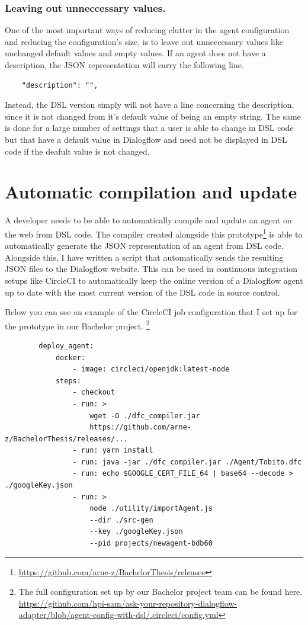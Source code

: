 \subsubsection{Leaving out unneccessary values.}

One of the most important ways of reducing clutter in the agent configuration and reducing the configuration's size, is to leave out unneccessary values like unchanged default values and empty values.
If an agent does not have a description, the JSON representation will carry the following line.
\begin{verbatim}
    "description": "",
\end{verbatim}
Instead, the DSL version simply will not have a line concerning the description, since it is not changed from it's default value of being an empty string.
The same is done for a large number of settings that a user is able to change in DSL code but that have a default value in Dialogflow and need not be displayed in DSL code if the deafult value is not changed.


\section{Automatic compilation and update}
A developer needs to be able to automatically compile and update an agent on the web from DSL code.
The compiler created alongside this prototype\footnote{\url{https://github.com/arne-z/BachelorThesis/releases}} is able to automatically generate the JSON representation of an agent from DSL code.
Alongside this, I have written a script that automatically sends the resulting JSON files to the Dialogflow website.
This can be used in continuous integration setups like CircleCI \cite{CircleCI} to automatically keep the online version of a Dialogflow agent up to date with the most current version of the DSL code in source control.

Below you can see an example of the CircleCI job configuration that I set up for the prototype in our Bachelor project.
\footnote{The full configuration set up by our Bachelor project team can be found here.\\
\url{https://github.com/hpi-sam/ask-your-repository-dialogflow-adapter/blob/agent-config-with-dsl/.circleci/config.yml}}
\begin{samepage}    
    \begin{verbatim}
        deploy_agent:
            docker:
                - image: circleci/openjdk:latest-node
            steps:
                - checkout
                - run: > 
                    wget -O ./dfc_compiler.jar
                    https://github.com/arne-z/BachelorThesis/releases/...
                - run: yarn install
                - run: java -jar ./dfc_compiler.jar ./Agent/Tobito.dfc
                - run: echo $GOOGLE_CERT_FILE_64 | base64 --decode > ./googleKey.json
                - run: >
                    node ./utility/importAgent.js 
                    --dir ./src-gen 
                    --key ./googleKey.json 
                    --pid projects/newagent-bdb60
    \end{verbatim}
\end{samepage}

